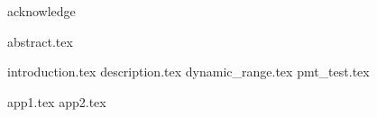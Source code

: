 \documentclass[UTF8, nocolorlinks, openany, spacing, pdftoc, pkuspace]{impthss}
\begin{document}
	\covermatter
 	
 	\null\newpage
 	
 	\null\newpage

	
	
	{acknowledge}
	
	\frontmatter
	{abstract.tex}
	\tableofcontents

	\mainmatter
	{introduction.tex}
	{description.tex}
	{dynamic_range.tex}
	{pmt_test.tex}
	\begin{comment}
	{construction.tex}
	{cosmic_ray.tex}
	{heavy_ion.tex}
	{conclusion.tex}
	\end{comment}
	\appendix
	\printbibliography[
		heading = bibintoc,
		sorting = ecnty
	]
	{app1.tex}
	{app2.tex}
	
	
	\backmatter
	
\end{document}
